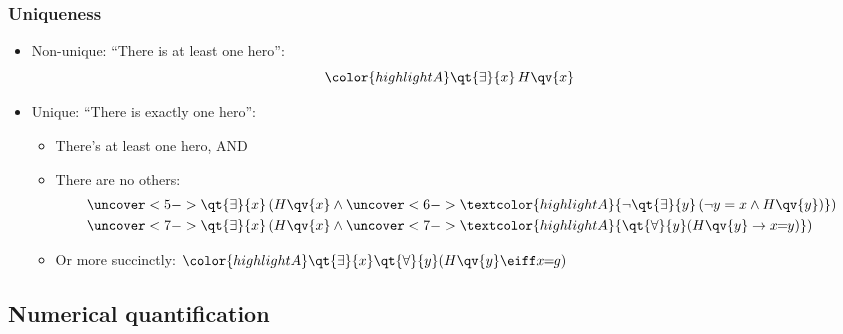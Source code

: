\begin{frame}
    \frametitle{Uniqueness}

\begin{itemize}[<+->]
\item Non-unique: ``There is at least one hero'':
\[\color{highlightA}
\qt{\exists}{x}\, H\qv{x}
\]
\item Unique: ``There is exactly one hero'':
\begin{itemize}[<+->]
\item There's at least one hero, AND
\item There are no others:
\begin{align*}
\uncover<5->{\qt{\exists}{x}\, (H\qv{x} \land {}} & 
  \uncover<6->{\textcolor{highlightA}{\lnot \qt{\exists}{y}\, (\lnot y = x \land H\qv{y})})}\\
\uncover<7->{\qt{\exists}{x}\,(H\qv{x} \land {}} & 
\uncover<7->{\textcolor{highlightA}{\qt{\forall}{y}(H\qv{y} \to x\!\!=\!\!y)})}
\end{align*}
\item<8>Or more succinctly: 
$\color{highlightA}\qt{\exists}{x}\qt{\forall}{y}(H\qv{y} \eiff x\!\!=\!\!g)$
\end{itemize}
\end{itemize}
\end{frame}


\subsection{Numerical quantification}

